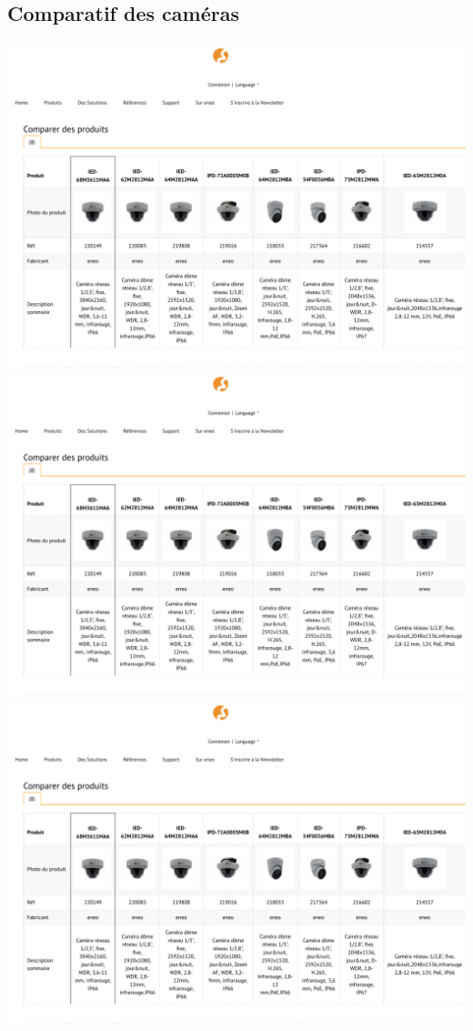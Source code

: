 \documentclass[12pt, french]{report}
\begin{document}
\subsection{Comparatif des caméras}
\label{Comparatif.pdf}
\includegraphics[width=\textwidth,page=1]{Dimensionnement/Comparatif.pdf}
\includegraphics[width=\textwidth,page=2]{Dimensionnement/Comparatif.pdf}
\includegraphics[width=\textwidth,page=4]{Dimensionnement/Comparatif.pdf}
\end{document}
